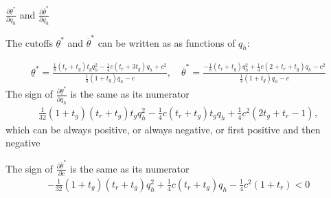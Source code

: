 \documentclass[9pt,aspectratio=1610]{beamer}
\begin{document}
\begin{frame}{$\frac{\partial\underline{\theta}^*}{\partial q_h}$ and $\frac{\partial\overline{\theta}^*}{\partial q_h}$}\label{partial_qh}

The cutoffs $\underline{\theta}^*$ and $\overline{\theta}^*$ can be written as as functions of $q_h$:

\begin{align*}
    \underline{\theta}^* = \frac{\frac{1}{8}(t_r+t_g)t_gq_h^2 - \frac{1}{4}c(t_r+3t_g)q_h +c^2}{\frac{1}{4}(1+t_g)q_h -c},\quad \overline{\theta}^* = \frac{-\frac{1}{8}(t_r+t_g)q_h^2 +\frac{1}{4}c(2+t_r+t_g)q_h -c^2}{\frac{1}{4}(1+t_g)q_h -c}
\end{align*}
The sign of $\frac{\partial \underline{\theta}^*}{\partial q_h}$ is the same as its numerator
\begin{align*}
    \frac{1}{32}(1+t_g)(t_r+t_g)t_gq_h^2 -\frac{1}{4}c(t_r+t_g)t_gq_h + \frac{1}{4}c^2(2t_g+t_r-1), 
\end{align*}
which can be always positive, or always negative, or first positive and then negative
\vspace{1em}

The sign of $\frac{\partial \overline{\theta}^*}{\partial c}$ is the same as its numerator
\begin{align*}
    -\frac{1}{32}(1+t_g)(t_r+t_g)q_h^2 +\frac{1}{4}c(t_r+t_g)q_h -\frac{1}{4}c^2(1+t_r)<0
\end{align*}
\vspace{1em}

\hyperlink{proof_partial_qh}{}
\vspace{1em}
\end{frame}
\end{document}
